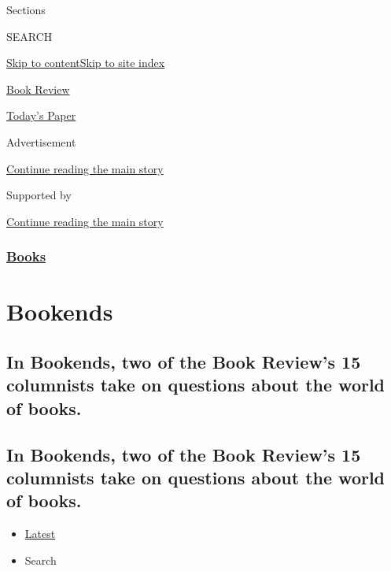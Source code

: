 Sections

SEARCH

\protect\hyperlink{site-content}{Skip to
content}\protect\hyperlink{site-index}{Skip to site index}

\href{https://www.nytimes3xbfgragh.onion/section/books/review}{Book
Review}

\href{https://myaccount.nytimes3xbfgragh.onion/auth/login?response_type=cookie\&client_id=vi}{}

\href{https://www.nytimes3xbfgragh.onion/section/todayspaper}{Today's
Paper}

Advertisement

\protect\hyperlink{after-top}{Continue reading the main story}

Supported by

\protect\hyperlink{after-sponsor}{Continue reading the main story}

\hypertarget{books}{%
\subsubsection{\texorpdfstring{\href{/section/books}{Books}}{Books}}\label{books}}

\hypertarget{bookends}{%
\section{Bookends}\label{bookends}}

\hypertarget{in-bookends-two-of-the-book-reviews-15-columnists-take-on-questions-about-the-world-of-books}{%
\subsection{In Bookends, two of the Book Review's 15 columnists take on
questions about the world of
books.}\label{in-bookends-two-of-the-book-reviews-15-columnists-take-on-questions-about-the-world-of-books}}

\hypertarget{in-bookends-two-of-the-book-reviews-15-columnists-take-on-questions-about-the-world-of-books-1}{%
\subsection{In Bookends, two of the Book Review's 15 columnists take on
questions about the world of
books.}\label{in-bookends-two-of-the-book-reviews-15-columnists-take-on-questions-about-the-world-of-books-1}}

\begin{itemize}
\tightlist
\item
  \protect\hyperlink{stream-panel}{Latest}
\item
  Search
\end{itemize}

